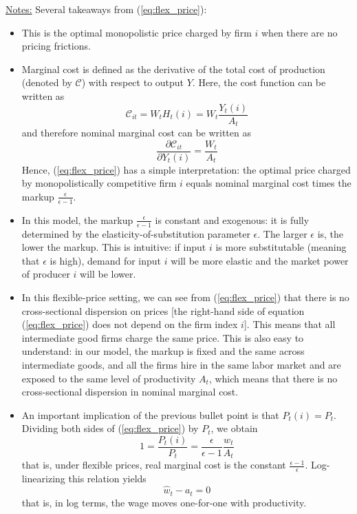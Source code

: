 \documentclass[12pt]{article}
\begin{document}
\underline{Notes:} Several takeaways from (\ref{eq:flex_price}):
\begin{itemize}
	\item This is the optimal monopolistic price charged by firm $i$ when there are no pricing frictions.
	\item Marginal cost is defined as the derivative of the total cost of production (denoted by $\mathcal{C}$) with respect to output $Y$. Here, the cost function can be written as
	\[\mathcal{C}_{it} = W_t H_t(i) = W_t \frac{Y_t(i)}{A_t}\]  
	and therefore nominal marginal cost can be written as
	\[\frac{\partial \mathcal{C}_{it}}{\partial Y_t(i)} = \frac{W_t}{A_t}\]
	Hence, (\ref{eq:flex_price}) has a simple interpretation: the optimal price charged by monopolistically competitive firm $i$ equals nominal marginal cost times the markup $\frac{\epsilon }{\epsilon -1}$. 
	\item In this model, the markup $\frac{\epsilon }{\epsilon -1}$ is constant and exogenous: it is fully determined by the elasticity-of-substitution parameter $\epsilon$. The larger $\epsilon$ is, the lower the markup. This is intuitive: if input $i$ is more substitutable (meaning that $\epsilon$ is high), demand for input $i$ will be more elastic and the market power of producer $i$ will be lower.
	\item In this flexible-price setting, we can see from (\ref{eq:flex_price}) that there is no cross-sectional dispersion on prices [the right-hand side of equation (\ref{eq:flex_price}) does not depend on the firm index $i$]. This means that all intermediate good firms charge the same price. This is also easy to understand: in our model, the markup is fixed and the same across intermediate goods, and all the firms hire in the same labor market and are exposed to the same level of productivity $A_t$, which means that there is no cross-sectional dispersion in nominal marginal cost. 
	\item An important implication of the previous bullet point is that $P_t(i) = P_t$. Dividing both sides of (\ref{eq:flex_price}) by $P_t$, we obtain
	\[1 = \frac{P_t(i)}{P_t} = \frac{\epsilon}{\epsilon-1}\frac{w_t}{A_t}\]  
	that is, under flexible prices, real marginal cost is the constant $\frac{\epsilon -1}{\epsilon}$. Log-linearizing this relation yields
	\begin{equation} \label{eq:flex_price_wage}
		\hat{w}_t - a_t = 0
	\end{equation}
that is, in log terms, the wage moves one-for-one with productivity.
\end{itemize} 
\end{document}

